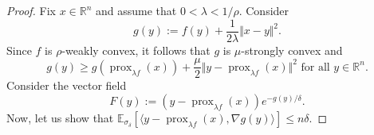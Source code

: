 \documentclass[10pt,a4paper]{amsart}
\begin{document}
\begin{proof} 
Fix $x\in \mathbb{R}^n$ and assume that $0<\lambda <1/\rho$. Consider 
\begin{equation*}
g(y):=f(y)+\frac{1}{2\lambda}\Vert x-y\Vert^2.
\end{equation*}
Since $f$ is $\rho$-weakly convex, it follows that $g$ is $\mu$-strongly convex and
\begin{equation}\label{growth}
    g(y)\geq g(\operatorname{prox}_{\lambda f}(x))+\frac{\mu}{2}\Vert y-\operatorname{prox}_{\lambda f}(x)\Vert^2 \textrm{ for all } y\in \mathbb{R}^n.
\end{equation}
Consider the vector field
$$
F(y):=(y-\operatorname{prox}_{\lambda f}(x))e^{-g(y)/\delta}.
$$
Now, let us show that  $\mathbb{E}_{\sigma_{\delta}}\left[\langle y-\operatorname{prox}_{\lambda f}(x),\nabla g(y)\rangle \right]\leq n\delta$.
 

\end{proof}
\end{document}
